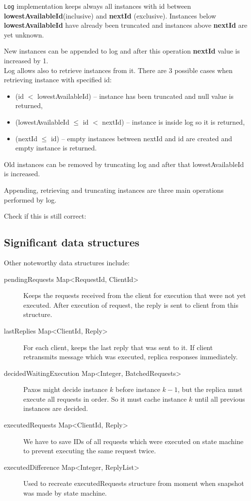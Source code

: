 \texttt{Log} implementation keeps always all instances with id between \textbf{lowestAvailableId}(inclusive) and \textbf{nextId} (exclusive). Instances below \textbf{lowestAvailableId} have already been truncated and instances above \textbf{nextId} are yet unknown.

New instances can be appended to log and after this operation \textbf{nextId} value is increased by 1. \\Log allows also to retrieve instances from it. There are 3 possible cases when retrieving instance with specified id:
\begin{itemize}
  \item (id $<$ lowestAvailableId) -- instance has been truncated and null value is returned,
  \item (lowestAvailableId $\leq$ id $<$ nextId) -- instance is inside log so it is returned,
  \item (nextId $\leq$ id) -- empty instances between nextId and id are created and empty instance is returned.
\end{itemize}
Old instances can be removed by truncating log and after that lowestAvailableId is increased. 

Appending, retrieving and truncating instances are three main operations performed by log.

Check if this is still correct:

\subsection{Significant data structures}
Other noteworthy data structures include:
\label{subsubsec:significant_structures}
  \begin{description}
    \item[pendingRequests Map\textless RequestId, ClientId\textgreater] Keeps the requests received from the client for execution that were not yet executed. After execution of request, the reply is sent to client from this structure.
    \item[lastReplies Map\textless ClientId, Reply\textgreater] For each client, keeps the last reply that was sent to it. If client retransmits message which was executed, replica responses immediately.
    \item[decidedWaitingExecution Map\textless Integer, BatchedRequests\textgreater] Paxos might decide instan\-ce $k$ before instance $k-1$, but the replica must execute all requests in order. So it must cache instance $k$ until all previous instances are decided.
    \item[executedRequests Map\textless ClientId, Reply\textgreater] We have to save IDs of all requests which were executed on state machine to prevent executing the same request twice.
	\item[executedDifference Map\textless Integer, ReplyList\textgreater] Used to recreate executedRequests structu\-re from moment when snapshot was made by state machine.
  \end{description}



